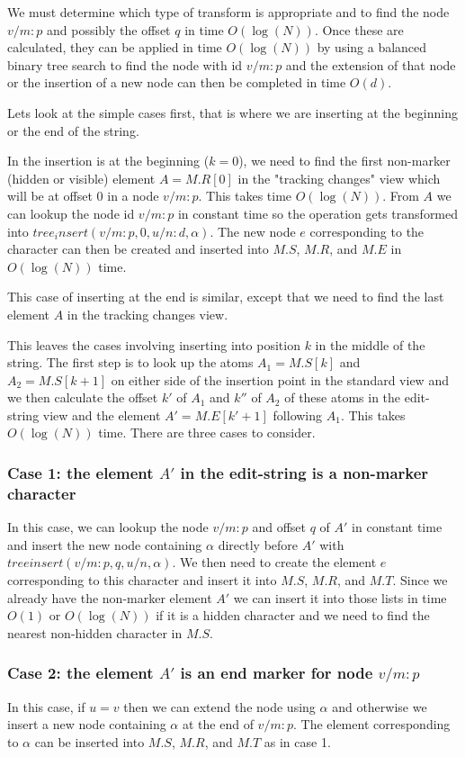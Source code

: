 \documentclass{amsart}
\begin{document}
We must determine which type of transform is appropriate and to find the node $v/m:p$ and possibly the offset $q$ 
in time $O(\log(N))$.
Once these are calculated, they can be applied in time $O(\log(N))$ by using
a balanced binary tree search to find the node with id $v/m:p$ and the extension
of that node or the insertion of a new node can then be completed in time $O(d)$.


Lets look at the simple cases first, that is where we are inserting at the
beginning or the end of the string. 

In the insertion is at the beginning ($k=0$), we need to find the first non-marker (hidden or visible) element $A=M.R[0]$ in the "tracking changes" view which will be at offset 0 in a node $v/m:p$. This takes time $O(\log(N))$.
From $A$ we can lookup the node id $v/m:p$ in constant time so the operation gets transformed into 
$tree_insert(v/m:p,0,u/n:d,\alpha)$. The new node $e$ corresponding to the character can then be created and inserted into $M.S$, $M.R$, and $M.E$ in
$O(\log(N))$ time.
 
This case of inserting at the end is similar, except that we need to find the last element $A$ in the tracking changes view. 

This leaves the cases involving inserting into position $k$ in the middle of the string.
The first step is to look up the atoms $A_1=M.S[k]$ and $A_2=M.S[k+1]$ on either side of
the insertion point in the standard view and we then calculate the offset $k'$ of $A_1$ and $k''$ of $A_2$ of these atoms in the edit-string view and
the element $A' = M.E[k'+1]$ following $A_1$. This takes
$O(\log(N))$ time. There are three cases to consider.

\subsubsection{Case 1: the element $A'$ in the edit-string is a non-marker character}
In this case, we can lookup the node $v/m:p$ and offset $q$ of $A'$ in constant time and insert the new node containing $\alpha$ directly before  $A'$ with
$treeinsert(v/m:p,q,u/n,\alpha)$. We then need to create the element $e$ corresponding to this character and insert it into $M.S$, $M.R$, and $M.T$.
Since we already have the non-marker element $A'$ we can insert it into those
lists in time $O(1)$ or $O(\log(N))$ if it is a hidden character and we need to find the nearest  non-hidden character in $M.S$.

\subsubsection{Case 2: the element $A'$ is an end marker for node $v/m:p$}
In this case, if $u=v$ then we can extend the node using $\alpha$ and otherwise
we insert a new node containing $\alpha$ at the end of $v/m:p$. The element
corresponding to $\alpha$ can be inserted into $M.S$, $M.R$, and $M.T$ as in case 1.
\end{document}
